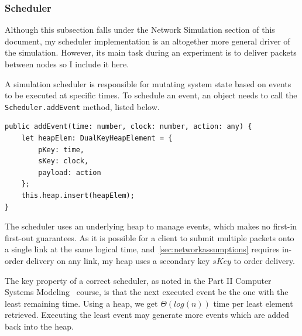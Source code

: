 \documentclass[12pt,a4paper,twoside,openright]{report}
\begin{document}
		
		\subsubsection{Scheduler}
		Although this subsection falls under the Network Simulation section of this document, my scheduler implementation is an altogether more general driver of the simulation. However, its main task during an experiment is to deliver packets between nodes so I include it here.
		
		A simulation scheduler is responsible for mutating system state based on events to be executed at specific times. To schedule an event, an object needs to call the \lstinline|Scheduler.addEvent| method, listed below.
\begin{lstlisting}[caption=The Scheduler.addEvent method]
public addEvent(time: number, clock: number, action: any) {
    let heapElem: DualKeyHeapElement = {
        pKey: time,
        sKey: clock,
        payload: action
    };
    this.heap.insert(heapElem);
}
\end{lstlisting}

		The scheduler uses an underlying heap to manage events, which makes no first-in first-out guarantees. As it is possible for a client to submit multiple packets onto a single link at the same logical time, and~\cref{sec:networkassumptions} requires in-order delivery on any link, my heap uses a secondary key $sKey$ to order delivery.
		
		The key property of a correct scheduler, as noted in the Part II Computer Systems Modeling~\cite[slide 120]{compsysmodeling} course, is that the next executed event be the one with the least remaining time. Using a heap, we get $\Theta (log(n))$ time per least element retrieved. Executing the least event may generate more events which are added back into the heap.
		
\end{document}
